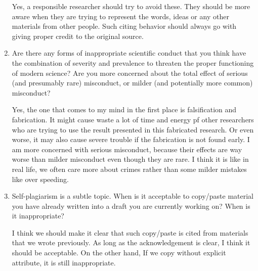 \documentclass[12pt]{article}
\begin{document}
\begin{enumerate}
Yes, a responsible researcher should try to avoid these. They should be more aware when they are trying to represent the words, ideas or any other materials from other people. Such citing behavior should always go with giving proper credit to the original source.

\item Are there any forms of inappropriate scientific conduct that you think have the combination of severity and prevalence to threaten the proper functioning of modern science? Are you more concerned about the total effect of serious (and presumably rare) misconduct, or milder (and potentially more common) misconduct?

Yes, the one that comes to my mind in the first place is falsification and fabrication. It might cause waste a lot of time and energy pf other researchers who are trying to use the result presented in this fabricated research. Or even worse, it may also cause severe trouble if the fabrication is not found early. I am more concerned with serious misconduct, because their effects are way worse than milder misconduct even though they are rare. I think it is like in real life, we often care more about crimes rather than some milder mistakes like over speeding.

\item Self-plagiarism is a subtle topic. When is it acceptable to copy/paste material you have already written into a draft you are currently working on? When is it inappropriate?

I think we should make it clear that such copy/paste is cited from materials that we wrote previously.
As long as the acknowledgement is clear, I think it should be acceptable. On the other hand, If we copy without explicit attribute, it is still inappropriate.

\end{enumerate}
\end{document}
